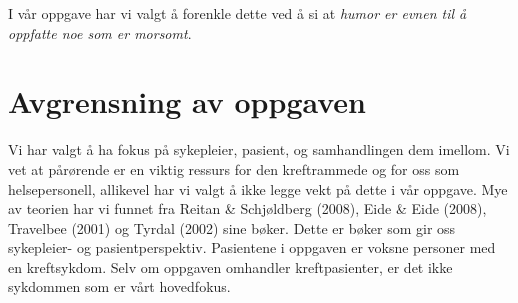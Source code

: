 I vår oppgave har vi valgt å forenkle dette ved å si at \textit{humor er evnen
til å oppfatte noe som er morsomt}.

\section{Avgrensning av oppgaven}

Vi har valgt å ha fokus på sykepleier, pasient, og samhandlingen dem imellom.
Vi vet at pårørende er en viktig ressurs for den kreftrammede og for oss som
helsepersonell, allikevel har vi valgt å ikke legge vekt på dette i vår
oppgave. Mye av teorien har vi funnet fra Reitan \&{} Schjøldberg (2008), Eide
\&
Eide (2008), Travelbee (2001) og Tyrdal (2002) sine bøker. Dette er bøker som
gir oss sykepleier- og pasientperspektiv. Pasientene i oppgaven er voksne
personer med en kreftsykdom. Selv om oppgaven omhandler kreftpasienter, er det
ikke sykdommen som er vårt hovedfokus.

